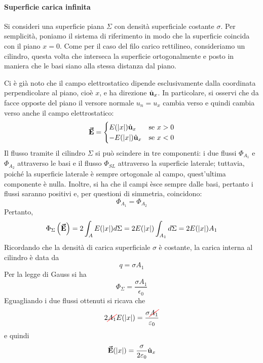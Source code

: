 \paragraph{Superficie carica infinita}
Si consideri una superficie piana $\Sigma$ con densità superficiale costante $\sigma$. Per semplicità, poniamo il sistema di riferimento in modo che la superficie coincida con il piano $x=0$. Come per il caso del filo carico rettilineo, consideriamo un cilindro, questa volta che interseca la superficie ortogonalmente e posto in maniera che le basi siano alla stessa distanza dal piano.

Ci è già noto che il campo elettrostatico dipende esclusivamente dalla coordinata perpendicolare al piano, cioè $x$, e ha direzione $\hat{\mathbf{u}}_x$. In particolare, si osservi che da facce opposte del piano il versore normale $u_n=u_x$ cambia verso e quindi cambia verso anche il campo elettrostatico:
\begin{equation*}
	\vb*{\va{E}}=
	\begin{cases}
		E(\abs{x})\hat{\mathbf{u}}_x&\text{se}\ x>0\\
		-E(\abs{x})\hat{\mathbf{u}}_x&\text{se}\ x<0
	\end{cases}
\end{equation*}
Il flusso tramite il cilindro $\Sigma$ si può scindere in tre componenti: i due flussi $\Phi_{A_1}$ e $\Phi_{A_2}$ attraverso le basi e il flusso $\Phi_{SL}$ attraverso la superficie laterale; tuttavia, poiché la superficie laterale è sempre ortogonale al campo, quest'ultima componente è nulla. Inoltre, si ha che il campi èsce sempre dalle basi, pertanto i flussi saranno positivi e, per questioni di simmetria, coincidono:
\begin{equation}
	\Phi_{A_1}=\Phi_{A_2}
\end{equation}
Pertanto,
\begin{equation*}
	\Phi_{\Sigma}\left(\vb*{\va{E}}\right)=2\int_A E(\abs{x})d\Sigma=2 E(\abs{x})\int_{A_1}d\Sigma=2E(\abs{x})A_1
\end{equation*}
Ricordando che la densità di carica superficiale $\sigma$ è costante, la carica interna al cilindro è data da
\begin{equation*}
	q=\sigma A_1
\end{equation*}
Per la legge di Gauss si ha
\begin{equation*}
	\Phi_{\Sigma}=\frac{\sigma A_1}{\epsilon_0}
\end{equation*}
Eguagliando i due flussi ottenuti si ricava che
\begin{equation*}
	2\Ccancel[red]{A_1}E(\abs{x})=\frac{\sigma \Ccancel[red]{A_1}}{\epsilon_0}
\end{equation*}
e quindi
\begin{equation}
	\vb*{\va{E}}(\abs{x})=\frac{\sigma}{2\varepsilon_0}\hat{\mathbf{u}}_x
\end{equation}
